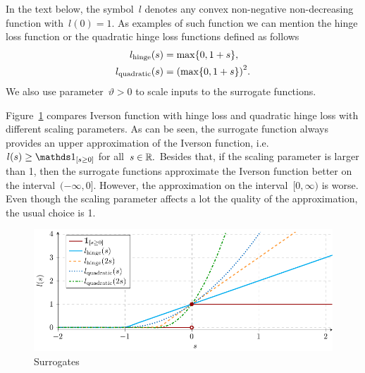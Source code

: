 \begin{notation}\label{not: surrogates}
  In the text below, the symbol~$l$ denotes any convex non-negative non-decreasing function with~$l(0) = 1$. As examples of such function we can mention the hinge loss function or the quadratic hinge loss functions defined as follows
  \begin{equation*}
    \begin{aligned}
      l_{\text{hinge}}(s) & = \max\Brac[c]{0, 1 + s}, \\
      l_{\text{quadratic}}(s) & = \Brac{\max\Brac[c]{0, 1 + s}}^2.\\
    \end{aligned}
  \end{equation*}
  We also use parameter~$\vartheta > 0$ to scale inputs to the surrogate functions.
\end{notation}

Figure~\ref{fig: surrogates} compares Iverson function with hinge loss and quadratic hinge loss with different scaling parameters. As can be seen, the surrogate function always provides an upper approximation of the Iverson function, i.e.~$l(s) \geq \Iverson{s \geq 0}$ for all~$s \in \mathbb{R}.$ Besides that, if the scaling parameter is larger than 1, then the surrogate functions approximate the Iverson function better on the interval~$(-\infty, 0]$. However, the approximation on the interval~$[0, \infty)$ is worse. Even though the scaling parameter affects a lot the quality of the approximation, the usual choice is 1.

\begin{figure}[t]
  \centering
  \includegraphics[width = \linewidth]{images/surrogates.pdf}
  \caption{Surrogates}
  \label{fig: surrogates}
\end{figure}

